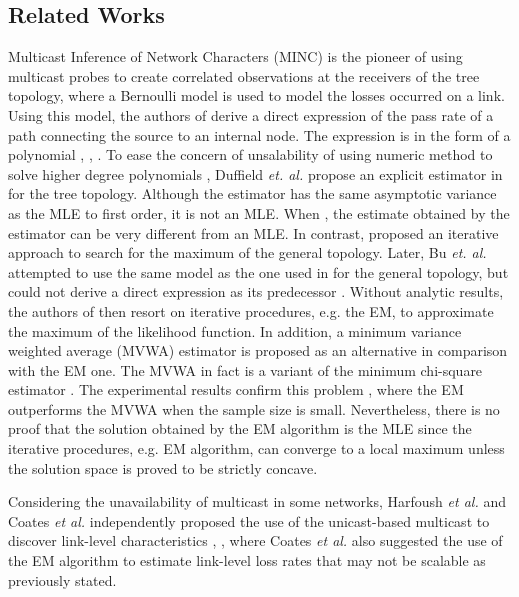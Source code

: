 \documentclass[10pt,twocolumn]{IEEEtran}
\begin{document}
\subsection{Related Works}
Multicast Inference of Network Characters (MINC) is the pioneer of
using multicast probes to create correlated observations at the
receivers of the tree topology, where a Bernoulli model is used to
model the losses occurred on a link. Using this model, the authors of
\cite{CDHT99} derive a direct expression of the pass rate of a path
connecting the source to an internal node. The expression is in the
form of a  polynomial \cite{CDHT99}, \cite{CDMT99}, \cite{CDMT99a}.
 To ease the concern of unsalability of
using numeric method to solve higher degree polynomials , Duffield {\it et. al.}  propose an explicit estimator in \cite{DHPT06} for the tree topology. Although the estimator has the same asymptotic variance as the
MLE to first order, it is not an MLE. When , the estimate
obtained by the estimator can be very different from an MLE. In
contrast, \cite{CDHT99} proposed an iterative approach to search for
the maximum of the general topology. Later, Bu {\it et. al.} attempted
to use the same model as the one used in \cite{CDHT99} for the general
topology, but could not derive a direct expression as its predecessor
\cite{BDPT}. Without analytic results, the authors of \cite{BDPT} then
resort on iterative procedures, e.g. the
 EM, to approximate the
 maximum of the likelihood function. In addition, a minimum variance weighted average (MVWA) estimator is proposed as an alternative in comparison with the EM
 one.
 The MVWA in
 fact is a variant of the minimum chi-square estimator
\cite{Rao80}. The experimental results
 confirm
this problem \cite{BDPT}, where the EM outperforms the MVWA when the
sample size is small. Nevertheless, there is no proof that the
solution obtained by the EM algorithm is the MLE since the iterative
procedures, e.g. EM algorithm, can converge to a local maximum unless
the solution space is proved to be strictly concave.

Considering the unavailability of multicast in some networks, Harfoush
{\it et al.} and Coates {\it et al.} independently proposed the use of
the unicast-based multicast to discover link-level characteristics
\cite{HBB00}, \cite{CN00}, where Coates {\it et al.} also suggested
the use of the EM algorithm to estimate link-level loss rates that may
not be scalable as previously stated.
\end{document}
